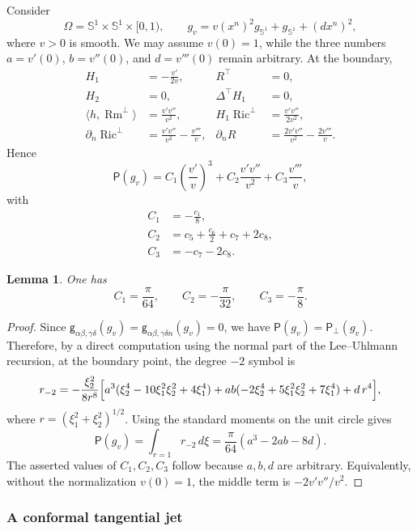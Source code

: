 \documentclass[11pt]{amsart}
\newcommand{\Ric}{\operatorname{Ric}}
\newcommand{\Rm}{\operatorname{Rm}}
\newtheorem{lemma}[theorem]{Lemma}
\theoremstyle{definition}
\numberwithin{equation}{section}
\begin{document}
Consider
\[
 \Omega=\mathbb S^1\times\mathbb S^1\times[0,1),\qquad
 g_v=v(x^n)^2g_{\mathbb S^1}+g_{\mathbb S^1}+(dx^n)^2,
\]
where $v>0$ is smooth.  We may assume $v(0)=1$, while the three numbers
$a=v'(0)$, $b=v''(0)$, and $d=v'''(0)$ remain arbitrary.  At the boundary,
\begin{equation}\label{eq: curvatures of g_v}
\begin{aligned}
 H_1&=-\frac{v'}{2v},
 &R^\top&=0,\\
 H_2&=0,
 &\Delta^\top H_1&=0,\\
 \langle h,\Rm^\bot\rangle&=\frac{v'v''}{v^2},
 &H_1\Ric^\bot&=\frac{v'v''}{2v^2},\\
 \partial_n\Ric^\bot&=\frac{v'v''}{v^2}-\frac{v'''}v,&
 \partial_nR&=\frac{2v'v''}{v^2}-\frac{2v'''}v.
\end{aligned}
\end{equation} 
Hence
\[
 \mathsf P(g_v)=C_1\left(\frac{v'}v\right)^3
 +C_2\frac{v'v''}{v^2}+C_3\frac{v'''}v,
\]
with
\begin{align}
 C_1&=-\frac{c_1}{8},\label{eq: c_1-c_8 7}\\
 C_2&=c_5+\frac{c_6}{2}+c_7+2c_8,\label{eq: c_1-c_8 8}\\
 C_3&=-c_7-2c_8.\label{eq: c_1-c_8 9}
\end{align}

\begin{lemma}
One has
\[
 C_1=\frac\pi{64},\qquad C_2=-\frac\pi{32},\qquad C_3=-\frac\pi8.
\]
\end{lemma}
\begin{proof}
Since $\mathsf g_{\alpha\beta,\gamma\delta}(g_v) = \mathsf g_{\alpha\beta,\gamma\delta n}(g_v) =  0$, we have $\mathsf P(g_v)=\mathsf P_\bot(g_v)$. Therefore, by a direct computation using the normal part of the Lee--Uhlmann recursion, at the boundary point, the degree $-2$ symbol is
\[
 r_{-2}=-\frac{\xi_2^2}{8r^8}\Bigl[
 a^3(\xi_2^4-10\xi_1^2\xi_2^2+4\xi_1^4)
 +ab(-2\xi_2^4+5\xi_1^2\xi_2^2+7\xi_1^4)
 +d\,r^4\Bigr],
\]
where $r=(\xi_1^2+\xi_2^2)^{1/2}$.  Using the standard moments on the unit circle gives
\[
 \mathsf P(g_v)=\int_{r=1}r_{-2}\,d\xi
 =\frac\pi{64}(a^3-2ab-8d).
\]
The asserted values of $C_1,C_2,C_3$ follow because $a,b,d$ are arbitrary.  Equivalently, without the normalization $v(0)=1$, the middle term is
$-2v'v''/v^2$.
\end{proof}

\subsubsection{A conformal tangential jet}
\end{document}
